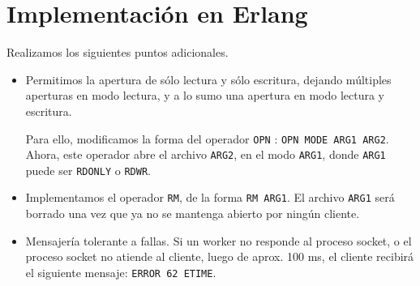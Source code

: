 \documentclass[a4paper, 8pt]{article}
\begin{document}
\begin{enumerate}
    
    
    
    
  \end{enumerate}


\section{Implementación en Erlang}

Realizamos los siguientes puntos adicionales.

\begin{itemize}
  \item Permitimos la apertura de sólo lectura y sólo escritura, dejando múltiples aperturas en modo lectura, y a lo sumo
  una apertura en modo lectura y escritura.
  
  Para ello, modificamos la forma del operador \texttt{OPN} :
  \texttt{OPN MODE ARG1 ARG2}. Ahora, este operador abre el archivo \texttt{ARG2}, en el modo \texttt{ARG1},
  donde \texttt{ARG1} puede ser \texttt{RDONLY} o \texttt{RDWR}.
  
  \item Implementamos el operador \texttt{RM}, de la forma
  \texttt{RM ARG1}. El archivo \texttt{ARG1} será borrado una vez que ya no se mantenga abierto por ningún cliente.
  
  \item Mensajería tolerante a fallas. Si un worker no responde al proceso socket, o el proceso socket no atiende
  al cliente, luego de aprox. 100 ms, el cliente recibirá el siguiente mensaje: \texttt{ERROR 62 ETIME}.
 
\end{itemize}
\end{document}

